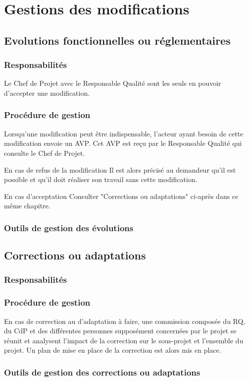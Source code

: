 \section{Gestions des modifications}

\subsection{Evolutions fonctionnelles ou réglementaires}

    \subsubsection{Responsabilités}
    Le Chef de Projet avec le Responsable Qualité sont les seuls en pouvoir 
    d'accepter une modification.

    \subsubsection{Procédure de gestion}
    Lorsqu'une modification peut être indispensable, l'acteur ayant besoin de 
cette modification envoie un AVP.
    Cet AVP est reçu par le Responsable Qualité qui consulte le Chef de Projet.
    
    \par{En cas de refus de la modification}
        Il est alors précisé au demandeur qu'il est possible et qu'il doit 
réaliser son travail sans cette modification.
    \par{En cas d'acceptation}
        Consulter "Corrections ou adaptations" ci-après dans ce même chapitre.

    \subsubsection{Outils de gestion des évolutions}

\subsection{Corrections ou adaptations}
    
    \subsubsection{Responsabilités}

    \subsubsection{Procédure de gestion}
    En cas de correction au d'adaptation à faire, une commission composée du 
RQ, du CdP et des différentes personnes supposément concernées par le projet se 
réunit et analysent l'impact de la correction sur le sous-projet et l'ensemble 
du projet.
    Un plan de mise en place de la correction est alors mis en place.

    \subsubsection{Outils de gestion des corrections ou adaptations}

        
